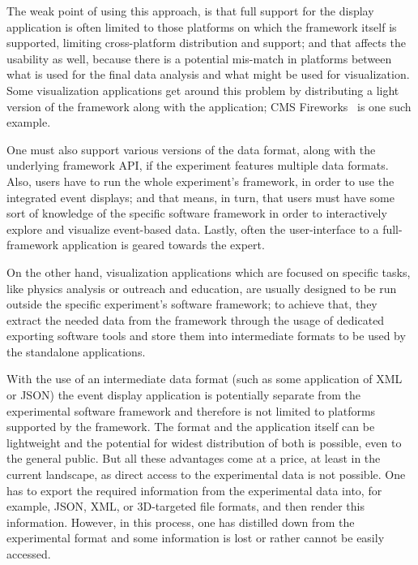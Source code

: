 \documentclass[12pt,a4paper]{article}
\begin{document}
The weak point of using this approach, is that full support for the display application is often limited to those platforms
on which the framework itself is supported, limiting cross-platform distribution and support; and that affects the usability
as well, because there is a potential mis-match in platforms between what is used for the final data analysis and what might
be used for visualization. Some visualization applications get around this problem by distributing a light version of the
framework along with the application; CMS Fireworks~\cite{CMSFireworks} is one such example.

One must also support various versions of the data format, along with the underlying framework API, if the experiment
features multiple data formats. Also, users have to run the whole experiment’s framework, in order to use the integrated event
displays; and that means, in turn, that users must have some sort of knowledge of the specific software framework in order
to interactively explore and visualize event-based data. Lastly, often the user-interface to a full-framework application
is geared towards the expert.

On the other hand, visualization applications which are focused on specific tasks, like physics analysis or outreach
and education, are usually designed to be run outside the specific experiment’s software framework; to achieve that,
they extract the needed data from the framework through the usage of dedicated exporting software tools and store them
into intermediate formats to be used by the standalone applications.

With the use of an intermediate data format (such as some application of XML or JSON) the event display application
is potentially separate from the experimental software framework and therefore is not limited to platforms supported
by the framework. The format and the application itself can be lightweight and the potential for widest distribution
of both is possible, even to the general public. But all these advantages come at a price, at least in the current landscape,
as direct access to the experimental data is not possible. One has to export the required information from the experimental
data into, for example, JSON, XML, or 3D-targeted file formats, and then render this information. However, in this process,
one has distilled down from the experimental format and some information is lost or rather cannot be easily accessed.

\end{document}
